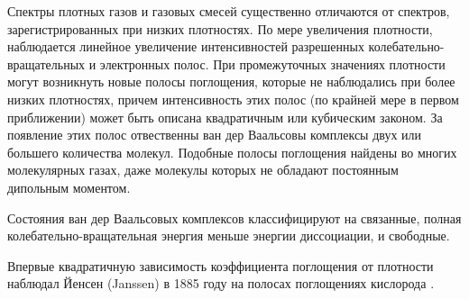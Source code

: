 Спектры плотных газов и газовых смесей существенно отличаются от спектров, зарегистрированных при низких плотностях. По мере увеличения плотности, наблюдается линейное увеличение интенсивностей разрешенных колебательно-вращательных и электронных полос. При промежуточных значениях плотности могут возникнуть новые полосы поглощения, которые не наблюдались при более низких плотностях, причем интенсивность этих полос (по крайней мере в первом приближении) может быть описана квадратичным или кубическим законом. За появление этих полос отвественны ван дер Ваальсовы комплексы двух или большего количества молекул. Подобные полосы поглощения найдены во многих молекулярных газах, даже молекулы которых не обладают постоянным дипольным моментом.  

Состояния ван дер Ваальсовых комплексов классифицируют на связанные, полная колебательно-вращательная энергия меньше энергии диссоциации, и свободные. 

Впервые квадратичную зависимость коэффициента поглощения от плотности наблюдал Йенсен (Janssen) в 1885 году на полосах поглощениях кислорода \cite{janssen1885}.
\fi
